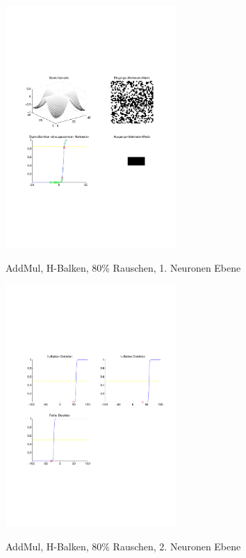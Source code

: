 \begin{figure}[hbt]
	\begin{minipage}[c]{\textwidth}
		\centering
       	\includegraphics[trim=71 213 43 212, clip, width=0.58\textwidth]{./Bilder/Auswertung/Endergebnis/TypeAddMul_Rauschen80_H_Line_Layer1}
		\caption{AddMul, H-Balken, 80\% Rauschen, 1. Neuronen Ebene}
		\label{AddMul_H_80_1}
		\vfill
		\centering
		\includegraphics[trim=71 213 43 212, clip, width=0.58\textwidth]{./Bilder/Auswertung/Endergebnis/TypeAddMul_Rauschen80_H_Line_Layer2}
		\caption{AddMul, H-Balken, 80\% Rauschen, 2. Neuronen Ebene}
		\label{AddMul_H_80_2}
	\end{minipage}
\end{figure}
\clearpage

